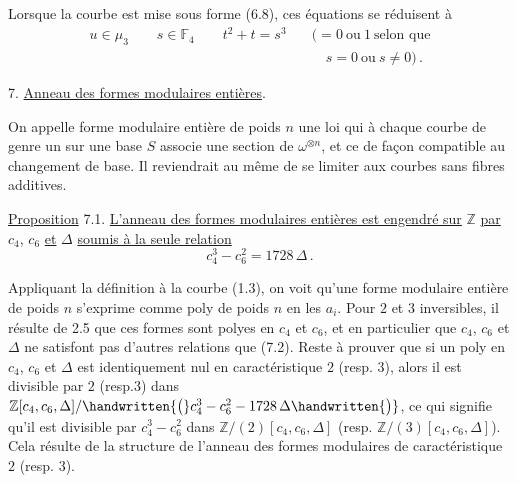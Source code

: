 Lorsque la courbe est mise sous forme (6.8), ces équations se réduisent à
\[
\begin{aligned}
u\in\mu_3 \qquad s\in\mathbb{F}_4 \qquad t^2+t=s^3
 &\quad ({}=0\ \text{ou}\ 1\ \text{selon que}\\
 &\qquad s=0\ \text{ou}\ s\ne 0) \, .
\end{aligned}
\]

7. \quad \uline{Anneau des formes modulaires entières}.

On appelle forme modulaire entière de poids $n$ une loi qui à chaque courbe de genre un sur une base $S$ associe une section de $\omega^{\otimes n}$, et ce de façon compatible au changement de base. Il reviendrait au même de se limiter aux courbes sans fibres additives.

\uline{Proposition} 7.1. \quad \uline{L'anneau des formes modulaires entières est engendré sur} $\mathbb{Z}$ \uline{par} $c_4$, $c_6$ \uline{et} $\Delta$ \uline{soumis à la seule relation}
\[
c_4^3-c_6^2=1728\,\Delta \, . \tag*{(7.2.)}
\]

Appliquant la définition à la courbe (1.3), on voit qu'une forme modulaire entière de poids $n$ s'exprime comme poly de poids $n$ en les $a_i$. Pour $2$ et $3$ inversibles, il résulte de 2.5 que ces formes sont  polyes en $c_4$ et $c_6$, et en particulier que $c_4$, $c_6$ et $\Delta$ ne satisfont pas d'autres relations que (7.2). Reste à prouver que si un poly en $c_4$, $c_6$ et $\Delta$ est identiquement nul en caractéristique $2$ (resp. $3$), alors il est divisible par $2$ (resp.$3$) dans $\mathbb{Z}[c_4,c_6,\Delta]/\handwritten{\bigl(}c_4^3-c_6^2-1728\,\Delta\handwritten{\bigr)}$, ce qui signifie%
%
\space
qu'il est divisible par $c_4^3-c_6^2$ dans $\mathbb{Z}/(2)[c_4,c_6,\Delta]$ (resp. $\mathbb{Z}/(3)[c_4,c_6,\Delta]$). Cela résulte de la structure de l'anneau des formes modulaires de caractéristique $2$ (resp. $3$).

